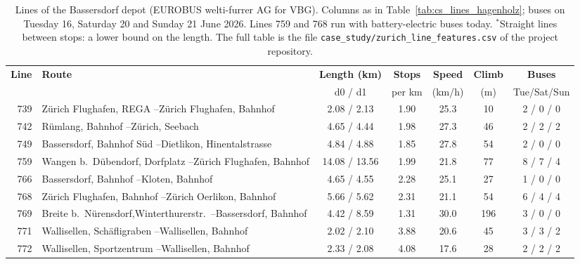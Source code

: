 \documentclass[11pt,a4paper]{article}
\theoremstyle{plain}
\theoremstyle{definition}
\theoremstyle{remark}
\begin{document}
\begin{table}[htbp]
\centering
\caption{Lines of the Bassersdorf depot (EUROBUS welti-furrer AG for VBG).
Columns as in Table~\ref{tab:cs_lines_hagenholz}; buses on Tuesday 16, Saturday 20 and Sunday 21 June 2026.
Lines 759 and 768 run with battery-electric buses today.
$^{*}$Straight lines between stops: a lower bound on the length.
The full table is the file \nolinkurl{case_study/zurich_line_features.csv} of the project repository.}
\label{tab:cs_lines_bassersdorf}
\small
\setlength{\tabcolsep}{4pt}
\begin{tabularx}{\linewidth}{@{}r>{\hsize=1.000\hsize\raggedright\arraybackslash}Xccccc@{}}
\toprule
\rowcolor{headgrey}
\textbf{Line} & \textbf{Route} & \textbf{Length (km)} & \textbf{Stops} & \textbf{Speed} & \textbf{Climb} & \textbf{Buses} \\
 & & d0 / d1 & per km & (km/h) & (m) & Tue/Sat/Sun \\
\midrule
739 & Z\"urich Flughafen, REGA --\newline Z\"urich Flughafen, Bahnhof & 2.08 / 2.13 & 1.90 & 25.3 & 10 & 2 / 0 / 0 \\
742 & R\"umlang, Bahnhof --\newline Z\"urich, Seebach & 4.65 / 4.44 & 1.98 & 27.3 & 46 & 2 / 2 / 2 \\
749 & Bassersdorf, Bahnhof S\"ud --\newline Dietlikon, Hinentalstrasse & 4.84 / 4.88 & 1.85 & 27.8 & 54 & 2 / 0 / 0 \\
759 & Wangen b.\ D\"ubendorf, Dorfplatz --\newline Z\"urich Flughafen, Bahnhof & 14.08 / 13.56 & 1.99 & 21.8 & 77 & 8 / 7 / 4 \\
766 & Bassersdorf, Bahnhof --\newline Kloten, Bahnhof & 4.65 / 4.55 & 2.28 & 25.1 & 27 & 1 / 0 / 0 \\
768 & Z\"urich Flughafen, Bahnhof --\newline Z\"urich Oerlikon, Bahnhof & 5.66 / 5.62 & 2.31 & 21.1 & 54 & 6 / 4 / 4 \\
769 & Breite b.\ N\"urensdorf,\newline Winterthurerstr.\ --\newline Bassersdorf, Bahnhof & 4.42 / 8.59 & 1.31 & 30.0 & 196 & 3 / 0 / 0 \\
771 & Wallisellen, Sch\"afligraben --\newline Wallisellen, Bahnhof & 2.02 / 2.10 & 3.88 & 20.6 & 45 & 3 / 3 / 2 \\
772 & Wallisellen, Sportzentrum --\newline Wallisellen, Bahnhof & 2.33 / 2.08 & 4.08 & 17.6 & 28 & 2 / 2 / 2 \\

\end{tabularx}
\end{table}
\end{document}

